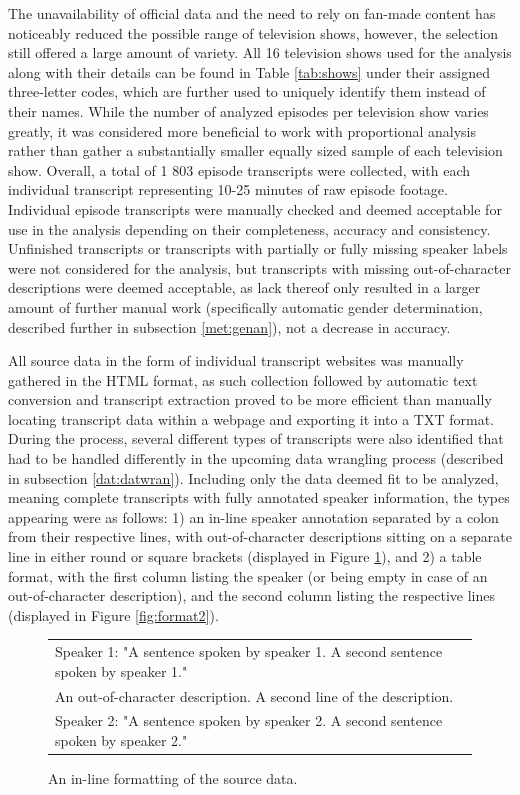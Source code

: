 \documentclass[a4paper, 11pt]{article}
\begin{document}
The unavailability of official data and the need to rely on fan-made content has noticeably reduced the possible range of television shows, however, the selection still offered a large amount of variety. All 16 television shows used for the analysis along with their details can be found in Table \ref{tab:shows} under their assigned three-letter codes, which are further used to uniquely identify them instead of their names. While the number of analyzed episodes per television show varies greatly, it was considered more beneficial to work with proportional analysis rather than gather a substantially smaller equally sized sample of each television show. Overall, a total of 1 803 episode transcripts were collected, with each individual transcript representing 10-25 minutes of raw episode footage. Individual episode transcripts were manually checked and deemed acceptable for use in the analysis depending on their completeness, accuracy and consistency. Unfinished transcripts or transcripts with partially or fully missing speaker labels were not considered for the analysis, but transcripts with missing out-of-character descriptions were deemed acceptable, as lack thereof only resulted in a larger amount of further manual work (specifically automatic gender determination, described further in subsection \ref{met:genan}), not a decrease in accuracy.

All source data in the form of individual transcript websites was manually gathered in the HTML format, as such collection followed by automatic text conversion and transcript extraction proved to be more efficient than manually locating transcript data within a webpage and exporting it into a TXT format. During the process, several different types of transcripts were also identified that had to be handled differently in the upcoming data wrangling process (described in subsection \ref{dat:datwran}). Including only the data deemed fit to be analyzed, meaning complete transcripts with fully annotated speaker information, the types appearing were as follows: 1) an in-line speaker annotation separated by a colon from their respective lines, with out-of-character descriptions sitting on a separate line in either round or square brackets (displayed in Figure \ref{fig:format1}), and 2) a table format, with the first column listing the speaker (or being empty in case of an out-of-character description), and the second column listing the respective lines (displayed in Figure \ref{fig:format2}).

\begin{figure}[h!]
  \centering
  \begin{small}
  \begin{tabular}{l}
  Speaker 1: "A sentence spoken by speaker 1. A second sentence spoken by speaker 1." \\
  An out-of-character description. A second line of the description. \\
  Speaker 2: "A sentence spoken by speaker 2. A second sentence spoken by speaker 2." \\
  \end{tabular}
  \end{small}
  \caption{An in-line formatting of the source data.}
  \label{fig:format1}
\end{figure}
\end{document}
